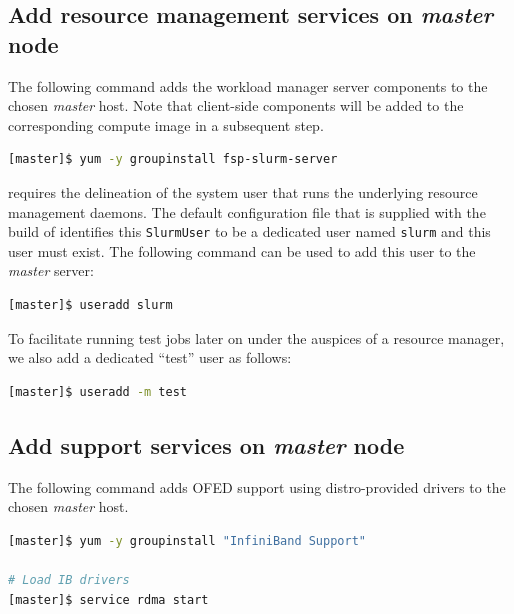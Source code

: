 \documentclass[letterpaper]{article}
\begin{document}
\subsection{Add resource management services on {\em master} node} \label{sec:add_rm}

The following command adds the \SLURM{} workload manager server components to the
chosen {\em master} host. Note that client-side components will be added to
the corresponding compute image in a subsequent step.

\begin{lstlisting}[language=bash,keywords={}]
[master]$ yum -y groupinstall fsp-slurm-server
\end{lstlisting}

\SLURM{} requires the delineation of the system user that runs the underlying
resource management daemons. The default configuration file that is supplied
with the \FSP{} build of \SLURM{} identifies this \texttt{SlurmUser} to be a
dedicated user named \texttt{slurm} and this user must exist. 
The following command can be used to add this user to the {\em
  master} server:

\begin{lstlisting}[language=bash,keywords={}]
[master]$ useradd slurm
\end{lstlisting}

To facilitate running test jobs later on under the auspices of a resource
manager, we also add a dedicated ``test'' user as follows:

\begin{lstlisting}[language=bash,keywords={}]
[master]$ useradd -m test
\end{lstlisting}

\subsection{Add \InfiniBand{} support services on {\em master} node} \label{sec:add_ofed}

The following command adds OFED support using distro-provided drivers to the
chosen {\em master} host. 

\begin{lstlisting}[language=bash,keywords={}]
[master]$ yum -y groupinstall "InfiniBand Support"

# Load IB drivers
[master]$ service rdma start
\end{lstlisting}
\end{document}
